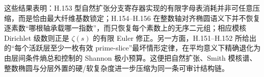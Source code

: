 \noindent
这些结果表明：H.153 型自然扩张分支寄存器实现的有限字母表消耗并非可任意压缩，而是恰由最大纤维基数锁定；H.154--H.156 在整数轴对齐椭圆语义下并不恢复逐素数“哪根轴承载哪一指数”，而只恢复每个素数上的无序二元组；相应模核 Dirichlet 级数则正是 \(\zeta(s)\) 的有限 Euler 修正。另一方面，H.151--H.152 所给出的“每个活跃层至少一枚有效 prime-slice”最坏情形定律，在平均意义下精确退化为由层间条件熵总和控制的 Shannon 极小预算。这便把自然扩张、Smith 模核谱、整数椭圆与分层外置的硬/软复杂度进一步压缩为同一条可审计结构链。

\endinput
